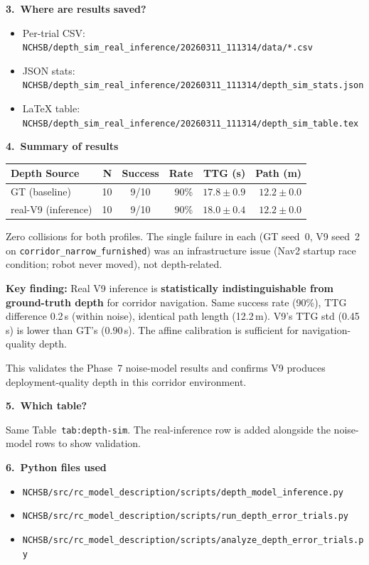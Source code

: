 \documentclass[11pt,a4paper]{article}
\begin{document}
\textbf{3.\ Where are results saved?}

\begin{itemize}
  \item Per-trial CSV: \texttt{NCHSB/depth\_sim\_real\_inference/20260311\_111314/data/*.csv}
  \item JSON stats: \texttt{NCHSB/depth\_sim\_real\_inference/20260311\_111314/depth\_sim\_stats.json}
  \item LaTeX table: \texttt{NCHSB/depth\_sim\_real\_inference/20260311\_111314/depth\_sim\_table.tex}
\end{itemize}

\textbf{4.\ Summary of results}

\begin{center}
\footnotesize
\begin{tabular}{lrcrrr}
\toprule
\textbf{Depth Source} & \textbf{N} & \textbf{Success} & \textbf{Rate}
  & \textbf{TTG (s)} & \textbf{Path (m)} \\
\midrule
GT (baseline)      & 10 & 9/10 & 90\% & $17.8 \pm 0.9$ & $12.2 \pm 0.0$ \\
real-V9 (inference) & 10 & 9/10 & 90\% & $18.0 \pm 0.4$ & $12.2 \pm 0.0$ \\
\bottomrule
\end{tabular}
\end{center}

Zero collisions for both profiles.  The single failure in each (GT seed~0,
V9 seed~2 on \texttt{corridor\_narrow\_furnished}) was an infrastructure
issue (Nav2 startup race condition; robot never moved), not depth-related.

\textbf{Key finding:} Real V9 inference is \textbf{statistically
indistinguishable from ground-truth depth} for corridor navigation.
Same success rate (90\%), TTG difference 0.2\,s (within noise), identical
path length (12.2\,m).  V9's TTG std (0.45\,s) is lower than GT's
(0.90\,s).  The affine calibration is sufficient for navigation-quality
depth.

This validates the Phase~7 noise-model results and confirms V9 produces
deployment-quality depth in this corridor environment.

\textbf{5.\ Which table?}

Same Table~\texttt{tab:depth-sim}.  The real-inference row is added
alongside the noise-model rows to show validation.

\textbf{6.\ Python files used}

\begin{itemize}
  \item \texttt{NCHSB/src/rc\_model\_description/scripts/depth\_model\_inference.py}
  \item \texttt{NCHSB/src/rc\_model\_description/scripts/run\_depth\_error\_trials.py}
  \item \texttt{NCHSB/src/rc\_model\_description/scripts/analyze\_depth\_error\_trials.py}
\end{itemize}
\end{document}
